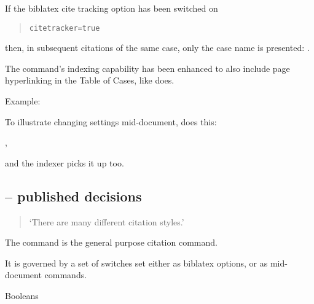 \p If the biblatex cite tracking option has been switched on 
\begin{quotation}
\hspace{2em}\verb|citetracker=true|
\end{quotation}
 then, in subsequent citations of the same case, only the case name is presented: .

\p The  command's indexing capability has been enhanced to also include page hyperlinking in the Table of Cases, like  does.

\p Example:

\bigskip

\setpartysepitalicoff
\p To illustrate changing settings mid-document,
 does this: 

, 

and the indexer picks it up too.

\subsection{ -- published decisions}
\begin{quotation}
`There are many different citation styles.' 
\medskip

\end{quotation}

\p The  command is the general purpose citation command.

\p It is governed by a set of switches set either as biblatex options, or as mid-document commands.
\bigskip

\newpage
\p Booleans

